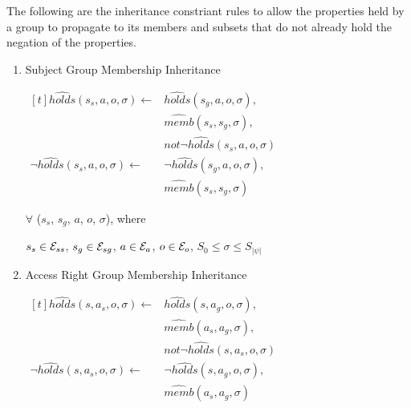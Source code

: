 \documentclass[10pt, twocolumn]{article}
\begin{document}
            The following are the inheritance constriant rules to allow the
            properties held by a group to propagate to its members and
            subsets that do not already hold the negation of the properties.

            \begin{enumerate}
              \item
                Subject Group Membership Inheritance

                \begin{math}
                  \begin{aligned}[t]
                    \hat{holds}(s_{s}, a, o, \sigma) \leftarrow &
                    \hat{holds}(s_{g}, a, o, \sigma), \\
                    & \hat{memb}(s_{s}, s_{g}, \sigma), \\
                    & not \lnot \hat{holds}(s_{s}, a, o, \sigma) \\
                    \lnot \hat{holds}(s_{s}, a, o, \sigma) \leftarrow &
                    \lnot \hat{holds}(s_{g}, a, o, \sigma), \\
                    & \hat{memb}(s_{s}, s_{g}, \sigma)
                  \end{aligned}
                \end{math}

                $\forall$ ($s_{s}$, $s_{g}$, $a$, $o$, $\sigma$), where

                $s_{s} \in {\cal E}_{ss}$,
                $s_{g} \in {\cal E}_{sg}$,
                $a \in {\cal E}_{a}$,
                $o \in {\cal E}_{o}$,
                $S_{0} \leq \sigma \leq S_{|\psi|}$

              \item
                Access Right Group Membership Inheritance

                \begin{math}
                  \begin{aligned}[t]
                    \hat{holds}(s, a_{s}, o, \sigma) \leftarrow &
                    \hat{holds}(s, a_{g}, o, \sigma), \\
                    & \hat{memb}(a_{s}, a_{g}, \sigma), \\
                    & not \lnot \hat{holds}(s, a_{s}, o, \sigma) \\
                    \lnot \hat{holds}(s, a_{s}, o, \sigma) \leftarrow &
                    \lnot \hat{holds}(s, a_{g}, o, \sigma), \\
                    & \hat{memb}(a_{s}, a_{g}, \sigma)
                  \end{aligned}
                \end{math}


\end{enumerate}
\end{document}
